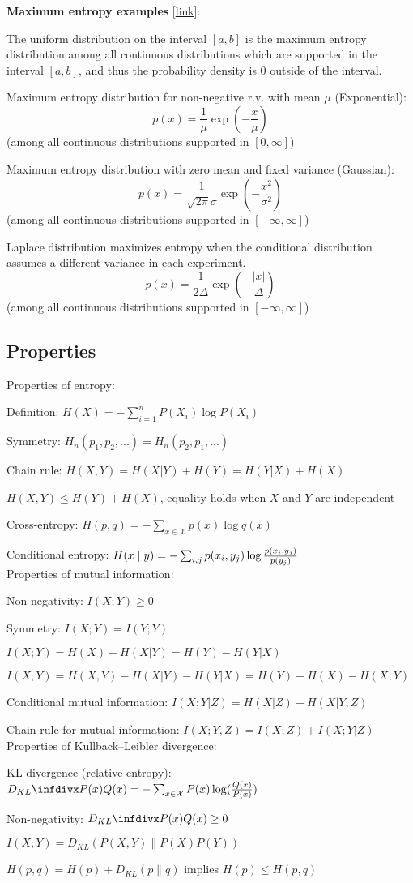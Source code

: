 \documentclass[12pt]{article}
\begin{document}
\textbf{Maximum entropy examples} [\href{https://en.wikipedia.org/wiki/Maximum_entropy_probability_distribution}{link}]:
\ulb
\item The uniform distribution on the interval $[a,b]$ is the maximum entropy distribution among all continuous distributions which are supported in the interval $[a, b]$, and thus the probability density is $0$ outside of the interval.
\item Maximum entropy distribution for non-negative r.v. with mean $\mu$ (Exponential):
\[ p(x) = \frac{1}{\mu} \exp(-\frac{x}{\mu}) \]
(among all continuous distributions supported in $[0,\infty]$)
\item Maximum entropy distribution with zero mean and fixed variance (Gaussian):
\[ p(x) = \frac{1}{\sqrt{2\pi} \sigma} \exp(-\frac{x^2}{\sigma^2}) \]
(among all continuous distributions supported in $[-\infty,\infty]$)
\item Laplace distribution maximizes entropy when the conditional distribution assumes a different variance in each experiment.
\[ p(x) = \frac{1}{2\Delta}\exp(-\frac{|x|}{\Delta}) \]
(among all continuous distributions supported in $[-\infty,\infty]$)
\ule

\subsection{Properties}
Properties of entropy:
\ulb
\item Definition: $H(X) = -\sum_{i=1}^n P(X_i) \log P(X_i)$
\item Symmetry: $H_n(p_1, p_2, ...) = H_n(p_2, p_1, ...)$
\item Chain rule: $H(X,Y) = H(X|Y) + H(Y) = H(Y|X) + H(X)$
\item $H(X,Y) \leq H(Y) + H(X)$, equality holds when $X$ and $Y$ are independent
\item Cross-entropy: $H(p,q) = -\sum_{x\in \mathcal{X}}p(x) \log q(x) $
\item Conditional entropy: $H(x\mid y) = -\sum_{i,j} p(x_i,y_j)\log\frac{p(x_i,y_j)}{p(y_j)}$
\ule
\  \\
Properties of mutual information:
\ulb
\item Non-negativity: $I(X;Y) \geq 0$
\item Symmetry: $I(X;Y) = I(Y;Y)$
\item $I(X;Y) = H(X) - H(X|Y) = H(Y) - H(Y|X)$
\item $I(X;Y) = H(X,Y) - H(X|Y) - H(Y|X) = H(Y) + H(X) - H(X,Y)$
\item Conditional mutual information: $I(X;Y|Z) = H(X|Z) - H(X|Y,Z)$
\item Chain rule for mutual information: $I(X;Y,Z) = I(X;Z) + I(X;Y|Z)$
\ule
\  \\
Properties of Kullback–Leibler divergence:
\ulb
\item KL-divergence (relative entropy): $\dkl{P(x)}{Q(x)} = -\sum_{x\in \mathcal{X}} P(x) \log(\frac{Q(x)}{P(x)})$
\item Non-negativity: $\dkl{P(x)}{Q(x)} \geq 0$
\item $I(X;Y) = D_{KL}(P(X,Y) \parallel P(X)P(Y))$
\item $ H(p,q) = H(p) + D_{KL}(p\parallel q) $ implies $ H(p) \leq H(p,q) $
\ule
\end{document}
